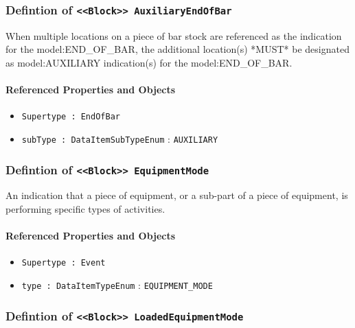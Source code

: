 \subsubsection{Defintion of \texttt{<<Block>> AuxiliaryEndOfBar}}
  \label{type:AuxiliaryEndOfBar}

\FloatBarrier

When multiple locations on a piece of bar stock are referenced as the indication for the {model:END_OF_BAR}, the additional location(s) *MUST* be designated as {model:AUXILIARY} indication(s) for the {model:END_OF_BAR}.  

\FloatBarrier
\paragraph{Referenced Properties and Objects}

\begin{itemize}
\item \texttt{Supertype : EndOfBar}

\item \texttt{subType : DataItemSubTypeEnum} : \texttt{AUXILIARY}

\end{itemize}
\FloatBarrier
\subsubsection{Defintion of \texttt{<<Block>> EquipmentMode}}
  \label{type:EquipmentMode}

\FloatBarrier

An indication that a piece of equipment, or a sub-part of a piece of equipment, is performing specific types of activities.

\FloatBarrier
\paragraph{Referenced Properties and Objects}

\begin{itemize}
\item \texttt{Supertype : Event}

\item \texttt{type : DataItemTypeEnum} : \texttt{EQUIPMENT_MODE}

\end{itemize}
\FloatBarrier
\subsubsection{Defintion of \texttt{<<Block>> LoadedEquipmentMode}}
  \label{type:LoadedEquipmentMode}

